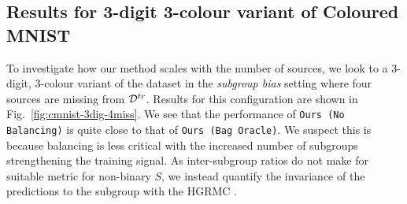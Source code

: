 
%
\subsection{Results for 3-digit 3-colour variant of Coloured MNIST}\label{ssec:3-digit-3-color}
%
To investigate how our method scales with the number of sources, we look to a 3-digit, 3-colour
variant of the dataset in the \emph{subgroup bias} setting where four sources are missing from
${\mathcal{D}}^{tr}$.
Results for this configuration are shown in Fig.~\ref{fig:cmnist-3dig-4miss}. We see that the
performance of \texttt{Ours (No Balancing)} is quite close to that of \texttt{Ours (Bag Oracle)}.
We suspect this is because balancing is less critical with the increased number of subgroups
strengthening the training signal. As inter-subgroup ratios do not make for suitable metric for
non-binary $S$, we instead quantify the invariance of the predictions to the subgroup with the
\ac{HGRMC} \cite{renyi1959measures}.

